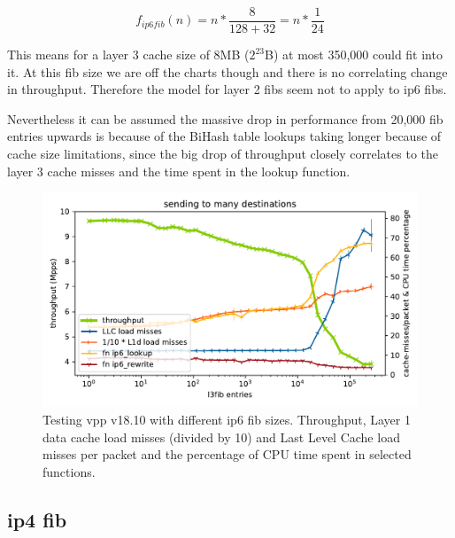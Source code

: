 $$ f_{ip6fib}(n) = n * \frac{8}{128 + 32} = n * \frac{1}{24}  $$

This means for a layer 3 cache size of 8MB ($2^{23}$B) at most 350,000
could fit into it. At this \Ac{fib} size we are off the charts though
and there is no correlating change in throughput. Therefore the model
for layer 2 \Ac{fib}s seem not to apply to \Ac{ip6} \Ac{fib}s.



Nevertheless it can be assumed the massive drop in performance from
20,000 \Ac{fib} entries upwards is because of the BiHash table lookups
taking longer because of cache size limitations, since the big drop of
throughput closely correlates to the layer 3 cache misses and the time
spent in the lookup function.



\begin{figure}[!ht]
\noindent\hspace{0.5mm}\includegraphics[width=\linewidth]{pics/throughput_l3v6_routes_klaipeda32ghz_v3.pdf}
\caption{Testing \Ac{vpp} v18.10 with different \Ac{ip6} \Ac{fib} sizes. Throughput, Layer 1 data cache load misses (divided by 10) and Last Level Cache load misses per packet and the percentage of CPU time spent in selected functions. }
\label{graph:ip6fib}
\end{figure}




\subsection{\Ac{ip4} \Ac{fib}}
\label{sec:ip4fib}

